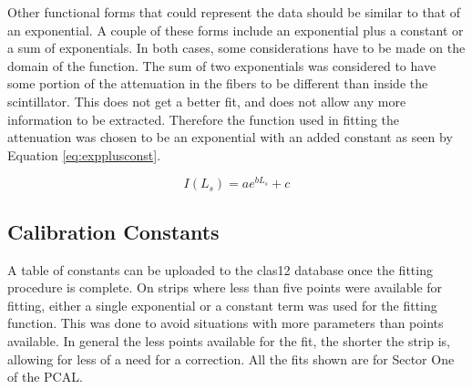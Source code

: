 Other functional forms that could represent the data should be similar to that of an exponential.
A couple of these forms include an exponential plus a constant or a sum of exponentials.
In both cases, some considerations have to be made on the domain of the function.
The sum of two exponentials was considered to have some portion of the attenuation in the fibers to 
be different than inside the scintillator. This does not get a better fit, and does not allow any more 
information to be extracted. Therefore the function used in fitting the attenuation was chosen to be 
an exponential with an added constant as seen by Equation \ref{eq:expplusconst}.

\begin{equation}
    I(L_{s}) = ae^{bL_{s}}+c
    \label{eq:expplusconst}
\end{equation}


\FloatBarrier
\subsection{Calibration Constants}
A table of constants can be uploaded to the clas12 database once the fitting procedure is complete.
On strips where less than five points were available for fitting, either 
a single exponential or a constant term was used for the fitting function. This was done to avoid situations 
with more parameters than points available. In general the less points available for the fit, the shorter 
the strip is, allowing for less of a need for a correction. All the fits shown are for Sector One of the PCAL.
\FloatBarrier
\vspace{5mm}

